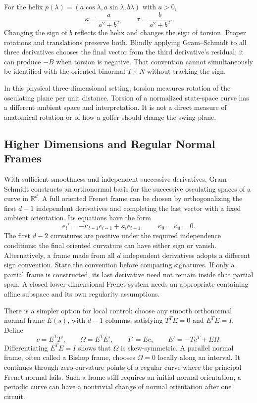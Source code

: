 \documentclass[12pt, openany]{book}
\theoremstyle{plain}
\begin{document}
For the helix $p(\lambda)=(a\cos\lambda,a\sin\lambda,b\lambda)$ with $a>0$,
\begin{equation}
 \kappa=\frac{a}{a^2+b^2},\qquad \tau=\frac{b}{a^2+b^2}.
\end{equation}
Changing the sign of $b$ reflects the helix and changes the sign of torsion.
Proper rotations and translations preserve both. Blindly applying
Gram--Schmidt to all three derivatives chooses the final vector from the
third derivative's residual; it can produce $-B$ when torsion is negative.
That convention cannot simultaneously be identified with the oriented
binormal $T\times N$ without tracking the sign.

In this physical three-dimensional setting, torsion measures rotation of the
osculating plane per unit distance. Torsion of a normalized state-space curve
has a different ambient space and interpretation. It is not a direct measure
of anatomical rotation or of how a golfer should change the swing plane.

\subsection{Higher Dimensions and Regular Normal Frames}

With sufficient smoothness and independent successive derivatives,
Gram--Schmidt constructs an orthonormal basis for the successive osculating
spaces of a curve in $\mathbb R^d$. A full oriented Frenet frame can be chosen
by orthogonalizing the first $d-1$ independent derivatives and completing the
last vector with a fixed ambient orientation. Its equations have the form
\begin{equation}
 e_i'=-\kappa_{i-1}e_{i-1}+\kappa_i e_{i+1},
 \qquad \kappa_0=\kappa_d=0.
\end{equation}
The first $d-2$ curvatures are positive under the required independence
conditions; the final oriented curvature can have either sign or vanish.
Alternatively, a frame made from all $d$ independent derivatives adopts a
different sign convention. State the convention before comparing signatures.
If only a partial frame is constructed, its last derivative need not remain
inside that partial span. A closed lower-dimensional Frenet system needs an
appropriate containing affine subspace and its own regularity assumptions.

There is a simpler option for local control: choose any smooth orthonormal
normal frame $E(s)$, with $d-1$ columns, satisfying
$T^TE=0$ and $E^TE=I$. Define
\begin{equation}
 c=E^TT',\qquad \Omega=E^TE',\qquad
 T'=Ec,\qquad E'=-Tc^T+E\Omega.
\end{equation}
Differentiating $E^TE=I$ shows that $\Omega$ is skew-symmetric. A parallel
normal frame, often called a Bishop frame, chooses $\Omega=0$ locally along
an interval. It continues through zero-curvature points of a regular curve
where the principal Frenet normal fails. Such a frame still requires an
initial normal orientation; a periodic curve can have a nontrivial change
of normal orientation after one circuit.
\end{document}
